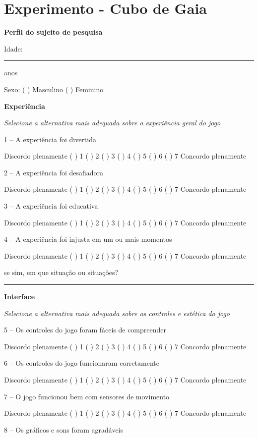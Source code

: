 \chapter{Experimento - Cubo de Gaia}
\noindent
\setlength{\parindent}{0pt}

\textbf{Perfil do sujeito de pesquisa}

Idade: \noindent\rule{1.5cm}{0.4pt} anos

Sexo: ( ) Masculino ( ) Feminino


\textbf{Experiência}

\textit{Selecione a alternativa mais adequada sobre a experiência geral do jogo}

1 – A experiência foi divertida

Discordo plenamente ( ) 1 ( ) 2 ( ) 3 ( ) 4 ( ) 5 ( ) 6 ( ) 7 Concordo plenamente



2 – A experiência foi desafiadora

Discordo plenamente ( ) 1 ( ) 2 ( ) 3 ( ) 4 ( ) 5 ( ) 6 ( ) 7 Concordo plenamente


3 – A experiência foi educativa

Discordo plenamente ( ) 1 ( ) 2 ( ) 3 ( ) 4 ( ) 5 ( ) 6 ( ) 7 Concordo plenamente


4 – A experiência foi injusta em um ou mais momentos

Discordo plenamente ( ) 1 ( ) 2 ( ) 3 ( ) 4 ( ) 5 ( ) 6 ( ) 7 Concordo plenamente

se sim, em que situação ou situações?

\rule{\linewidth-\marginparwidth}{0.4pt}


\textbf{Interface}

\textit{Selecione a alternativa mais adequada sobre os controles e estética do jogo}


5 – Os controles do jogo foram fáceis de compreender

Discordo plenamente ( ) 1 ( ) 2 ( ) 3 ( ) 4 ( ) 5 ( ) 6 ( ) 7 Concordo plenamente


6 – Os controles do jogo funcionaram corretamente

Discordo plenamente ( ) 1 ( ) 2 ( ) 3 ( ) 4 ( ) 5 ( ) 6 ( ) 7 Concordo plenamente


7 – O jogo funcionou bem com sensores de movimento

Discordo plenamente ( ) 1 ( ) 2 ( ) 3 ( ) 4 ( ) 5 ( ) 6 ( ) 7 Concordo plenamente


8 – Os gráficos e sons foram agradáveis

